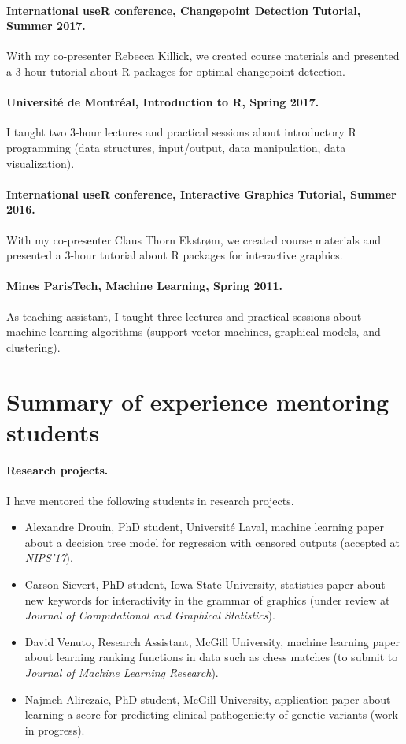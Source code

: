 \documentclass{article}
\begin{document}
\paragraph{International useR conference, Changepoint Detection
  Tutorial, Summer 2017.} With my co-presenter Rebecca Killick, we
created course materials and presented a 3-hour tutorial about R
packages for optimal changepoint detection. 

\paragraph{Universit\'e de Montr\'eal, Introduction to R, Spring
  2017.} I taught two 3-hour lectures and practical sessions about
introductory R programming (data structures, input/output, data
manipulation, data visualization).

\paragraph{International useR conference, Interactive Graphics
  Tutorial, Summer 2016.} With my co-presenter Claus Thorn Ekstr\o m,
we created course materials and presented a 3-hour tutorial about R
packages for interactive graphics.

\paragraph{Mines ParisTech, Machine Learning, Spring 2011.} As
teaching assistant, I taught three lectures and practical sessions
about machine learning algorithms (support vector machines, graphical
models, and clustering).

\section{Summary of experience mentoring students}

\paragraph{Research projects.} I have mentored the following
students in research projects.
\begin{itemize}
\item Alexandre Drouin, PhD student, Universit\'e Laval, machine
  learning paper about a decision tree model for regression with
  censored outputs (accepted at \emph{NIPS'17}).
\item Carson Sievert, PhD student, Iowa State University, statistics
  paper about new keywords for interactivity in the grammar of
  graphics (under review at \emph{Journal of Computational and Graphical
    Statistics}).
\item David Venuto, Research Assistant, McGill University, machine
  learning paper about learning ranking functions in data such as
  chess matches (to submit to \emph{Journal of Machine Learning
    Research}).
\item Najmeh Alirezaie, PhD student, McGill University, application
  paper about learning a score for predicting clinical pathogenicity
  of genetic variants (work in progress).
\end{itemize}
\end{document}
